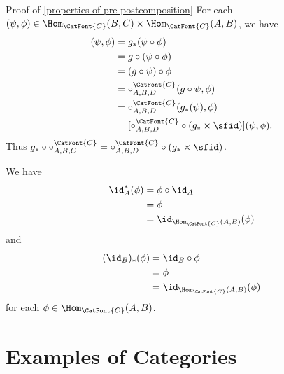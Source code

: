 \begin{Proof}{Proof of \cref{properties-of-pre-postcomposition}}
    For each $(\psi,\phi)\in\Hom_{\CatFont{C}}(B,C)\times\Hom_{\CatFont{C}}(A,B)$, we have
    \begin{align*}
        [g_{*}\circ\mathord{\circ^{\CatFont{C}}_{A,B,C}}](\psi,\phi) &= g_{*}(\psi\circ\phi)\\
                                                                     &= g\circ(\psi\circ\phi)\\
                                                                     &= (g\circ\psi)\circ\phi\\
                                                                     &= \mathord{\circ^{\CatFont{C}}_{A,B,D}}(g\circ\psi,\phi)\\
                                                                     &= \mathord{\circ^{\CatFont{C}}_{A,B,D}}(g_{*}(\psi),\phi)\\
                                                                     &= [\mathord{\circ^{\CatFont{C}}_{A,B,D}}\circ(g_{*}\times\sfid)](\psi,\phi).
    \end{align*}
    Thus $g_{*}\circ\mathord{\circ^{\CatFont{C}}_{A,B,C}}=\mathord{\circ^{\CatFont{C}}_{A,B,D}}\circ(g_{*}\times\sfid)$.

    We have
    \begin{align*}
        \id^{*}_{A}(\phi) &= \phi\circ\id_{A}\\
                          &= \phi\\
                          &= \id_{\Hom_{\CatFont{C}}(A,B)}(\phi)%
    \end{align*}
    and
    \begin{align*}
        (\id_{B})_{*}(\phi) &= \id_{B}\circ\phi\\
                            &= \phi\\
                            &= \id_{\Hom_{\CatFont{C}}(A,B)}(\phi)%
    \end{align*}
    for each $\phi\in\Hom_{\CatFont{C}}(A,B)$.
\end{Proof}
\section{Examples of Categories}\label{section-examples-of-categories}
